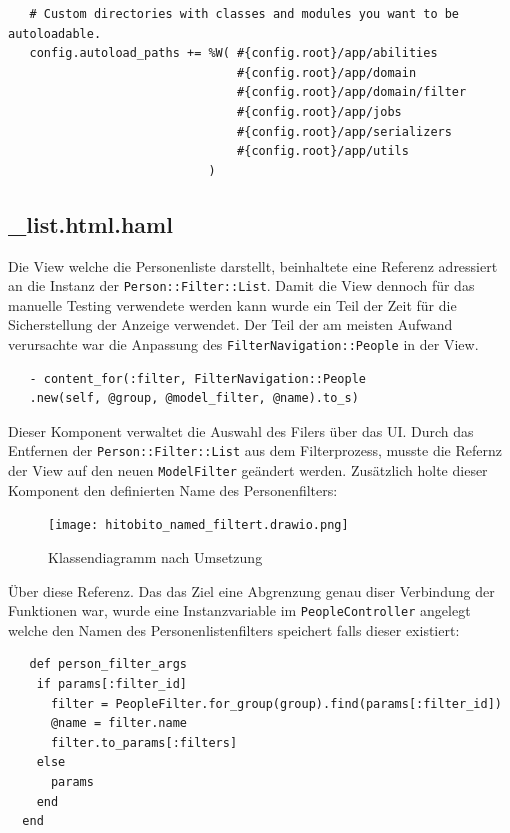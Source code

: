 \begin{verbatim}
   # Custom directories with classes and modules you want to be autoloadable.
   config.autoload_paths += %W( #{config.root}/app/abilities
                                #{config.root}/app/domain
                                #{config.root}/app/domain/filter
                                #{config.root}/app/jobs
                                #{config.root}/app/serializers
                                #{config.root}/app/utils
                            )
\end{verbatim}

\subsection{\_list.html.haml}
Die View welche die Personenliste darstellt, beinhaltete eine Referenz adressiert an die Instanz der \texttt{Person::Filter::List}. Damit die View dennoch für das manuelle Testing verwendete werden kann 
wurde ein Teil der Zeit für die Sicherstellung der Anzeige verwendet. Der Teil der am meisten Aufwand verursachte war die Anpassung des \texttt{FilterNavigation::People} in der View.

\begin{verbatim}
   - content_for(:filter, FilterNavigation::People
   .new(self, @group, @model_filter, @name).to_s)
\end{verbatim}

Dieser Komponent verwaltet die Auswahl des Filers über das UI. Durch das Entfernen der \texttt{Person::Filter::List} aus dem Filterprozess, musste die Refernz der View auf den neuen \texttt{ModelFilter}
geändert werden. Zusätzlich holte dieser Komponent den definierten Name des Personenfilters:

\newpage

\begin{figure}
   \centering
   \texttt{[image: hitobito\_named\_filtert.drawio.png]}
   \caption{Klassendiagramm nach Umsetzung}
\end{figure}

Über diese Referenz. Das das Ziel eine Abgrenzung genau diser Verbindung der Funktionen war, wurde eine Instanzvariable im \texttt{PeopleController} angelegt welche den Namen des Personenlistenfilters speichert
falls dieser existiert:

\begin{verbatim}
   def person_filter_args
    if params[:filter_id]
      filter = PeopleFilter.for_group(group).find(params[:filter_id])
      @name = filter.name
      filter.to_params[:filters]
    else
      params
    end
  end
\end{verbatim}

